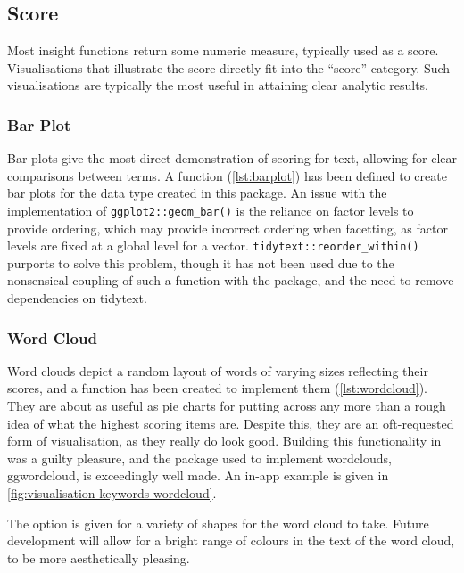 \documentclass[11pt, a4paper, twoside, titlepage]{report}
\begin{document}
\subsection{Score}\label{sec:score}

Most insight functions return some numeric measure, typically used as
a score. Visualisations that illustrate the score directly fit into
the ``score'' category. Such visualisations are typically the most
useful in attaining clear analytic results.

\subsubsection{Bar Plot}\label{sec:bar-plot}

Bar plots give the most direct demonstration of scoring for text,
allowing for clear comparisons between terms. A function
(\cref{lst:barplot}) has been defined to create bar plots for
the data type created in this package. An issue with the
implementation of \texttt{ggplot2::geom_bar()} is the reliance
on factor levels to provide ordering, which may provide incorrect
ordering when facetting, as factor levels are fixed at a global level
for a vector. \texttt{tidytext::reorder_within()} purports to
solve this problem, though it has not been used due to the nonsensical
coupling of such a function with the package, and the need to remove
dependencies on tidytext.

\subsubsection{Word Cloud}\label{sec:word-cloud}

Word clouds depict a random layout of words of varying sizes
reflecting their scores, and a function has been created to implement
them (\cref{lst:wordcloud}). They are about as useful as pie charts
for putting across any more than a rough idea of what the highest
scoring items are. Despite this, they are an oft-requested form of
visualisation, as they really do look good. Building this
functionality in was a guilty pleasure, and the package used to
implement wordclouds, ggwordcloud, is exceedingly well
made\autocite{pennec19}. An in-app example is given in
\cref{fig:visualisation-keywords-wordcloud}.

The option is given for a variety of shapes for the word cloud to
take. Future development will allow for a bright range of colours in
the text of the word cloud, to be more aesthetically pleasing.
\end{document}

